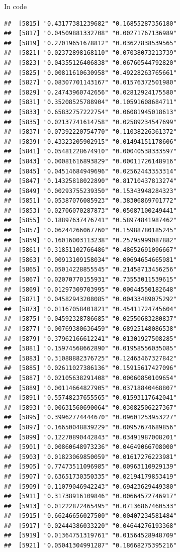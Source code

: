 \documentclass[ignorenonframetext,]{beamer}
\begin{document}
\begin{frame}[fragile]{In code}
\begin{verbatim}
##  [5815] "0.43177381239682" "0.16855287356180"
##  [5817] "0.04509881332708" "0.00271767136989"
##  [5819] "0.27019651678812" "0.03627838539565"
##  [5821] "0.02372898168110" "0.07038073213739"
##  [5823] "0.04355126406838" "0.06760544792820"
##  [5825] "0.00811610630958" "0.49228263765661"
##  [5827] "0.08307701143167" "0.01576372501980"
##  [5829] "0.24743960742656" "0.02812924175580"
##  [5831] "0.35208525788904" "0.10591608684711"
##  [5833] "0.65832757222754" "0.06081945018613"
##  [5835] "0.02137741614758" "0.02589234547699"
##  [5837] "0.07392220754770" "0.11038226361372"
##  [5839] "0.43323205902915" "0.01494151178606"
##  [5841] "0.05481228674910" "0.00040538333597"
##  [5843] "0.00081616893829" "0.00011726148916"
##  [5845] "0.04514684949696" "0.02562443353314"
##  [5847] "0.14325818022890" "0.81710437813274"
##  [5849] "0.00293755239350" "0.15343948284323"
##  [5851] "0.05387076085923" "0.38306869701772"
##  [5853] "0.02706070287873" "0.05087100249441"
##  [5855] "0.18897637476741" "0.58974841987462"
##  [5857] "0.06244266067760" "0.15988780185245"
##  [5859] "0.16016003113238" "0.25795999087882"
##  [5861] "0.31851102766486" "0.48652691096667"
##  [5863] "0.00913109158034" "0.00694654665981"
##  [5865] "0.05014228855545" "0.21458713456256"
##  [5867] "0.02070770155931" "0.73553011539615"
##  [5869] "0.01297309703995" "0.00044550182648"
##  [5871] "0.04582943208085" "0.00433489075292"
##  [5873] "0.01167058401821" "0.45411724745604"
##  [5875] "0.04592328786685" "0.02550683280837"
##  [5877] "0.00769380636459" "0.68925148086538"
##  [5879] "0.37962166612241" "0.01301927508285"
##  [5881] "0.15974568662890" "0.01958556035085"
##  [5883] "0.31088882376725" "0.12463467327842"
##  [5885] "0.02611027386136" "0.15915617427096"
##  [5887] "0.02105638291408" "0.00060850109654"
##  [5889] "0.00114664827905" "0.03718840468807"
##  [5891] "0.55748237655565" "0.01593117642041"
##  [5893] "0.00631560690064" "0.03082506227367"
##  [5895] "0.39962774444670" "0.09601253953227"
##  [5897] "0.16650048839229" "0.00957674689856"
##  [5899] "0.12270890442843" "0.03491987008201"
##  [5901] "0.00860648973236" "0.04649066708000"
##  [5903] "0.01823069850059" "0.01617276223981"
##  [5905] "0.77473511096985" "0.00963110929139"
##  [5907] "0.63651730350335" "0.02194179853419"
##  [5909] "0.11079046942243" "0.69423629449380"
##  [5911] "0.31738916109846" "0.00664572746917"
##  [5913] "0.01222872465495" "0.07136867460533"
##  [5915] "0.66246656027500" "0.00407234581484"
##  [5917] "0.02444386033220" "0.04644276193368"
##  [5919] "0.01364751319761" "0.01564528948709"
##  [5921] "0.05041304991287" "0.18668275395216"

\end{verbatim}
\end{frame}
\end{document}
